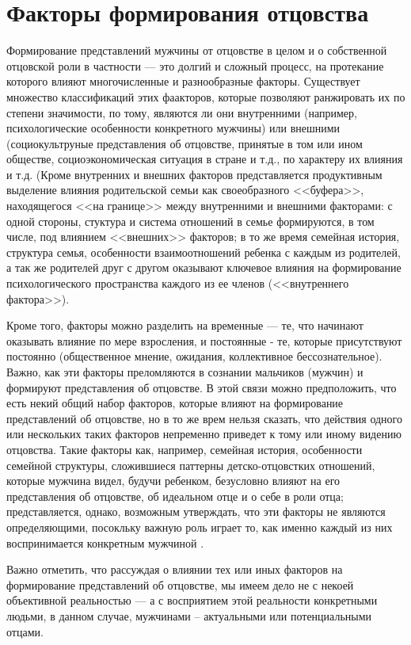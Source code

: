 \documentclass{../../common/thesisbyxetex}
\begin{document}
\chapter{Факторы формирования отцовства}

Формирование представлений мужчины от отцовстве в целом и о собственной отцовской роли в частности
--- это долгий и сложный процесс, на протекание которого влияют многочисленные и разнообразные
факторы. Существует множество классификаций этих фаакторов, которые позволяют ранжировать их по
степени значимости, по тому, являются ли они внутренними (например, психологические особенности
конкретного мужчины) или внешними  (социокультруные представления об отцовстве, принятые в том
или ином обществе, социоэкономическая ситуация в стране и т.д., по характеру их влияния и т.д.
(Кроме внутренних и внешних факторов представляется продуктивным выделение
влияния родительской семьи как своеобразного <<буфера>>, находящегося <<на границе>>
между внутренними и внешними факторами: с одной стороны, стуктура и система отношений в семье
формируются, в том числе, под влиянием <<внешних>> факторов; в то же
время семейная история, структура семья, особенности взаимоотношений ребенка с каждым из
родителей, а так же родителей друг с другом оказывают ключевое влияния на формирование
психологического пространства каждого из ее членов (<<внутреннего фактора>>).

Кроме того, факторы можно разделить на временные --- те, что начинают оказывать влияние по мере
взросления, и постоянные - те, которые присутствуют
постоянно  (общественное мнение, ожидания, коллективное бессознательное). Важно, как эти
факторы преломляются в сознании мальчиков (мужчин) и формируют представления об отцовстве. В этой
связи можно предположить, что есть некий общий набор факторов, которые влияют на формирование
представлений об
отцовстве, но в то же врем нельзя сказать, что действия одного или нескольких таких факторов
непременно приведет к тому или иному видению отцовства. Такие факторы как, например, семейная
история, особенности семейной структуры, сложившиеся паттерны детско-отцовстких отношений,
которые мужчина видел, будучи ребенком, безусловно влияют на его представления об отцовстве, об
идеальном отце и о себе в роли отца; представляется, однако, возможным утверждать, что эти
факторы не являются определяющими, посокльку важную роль играет то, как именно каждый из них
воспринимается конкретным мужчиной \cite[164]{long}.

Важно отметить, что рассуждая о влиянии тех или иных факторов на формирование
представлений об отцовстве, мы имеем дело не с некоей объективной реальностью --- а с восприятием
этой реальности конкретными людьми, в данном случае, мужчинами -- актуальными или потенциальными
отцами.
\end{document}
